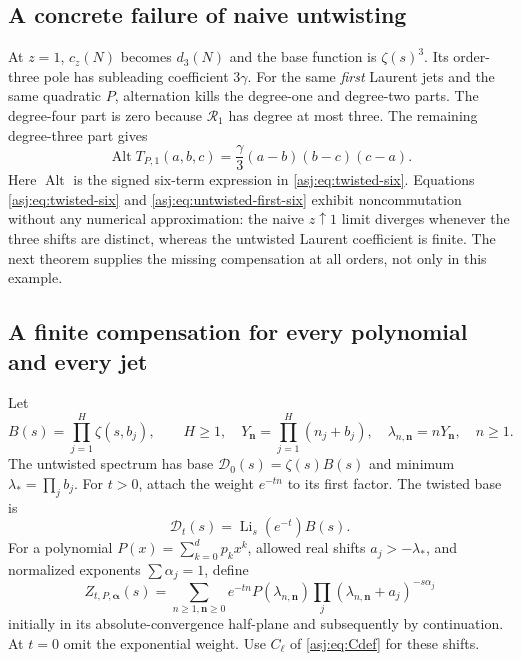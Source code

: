 \documentclass[11pt]{article}
\numberwithin{equation}{section}
\theoremstyle{definition}\newtheorem{definition}[theorem]{Definition}
\theoremstyle{remark}\newtheorem{remark}[theorem]{Remark}\newtheorem{example}[theorem]{Example}
\newcommand{\D}{\mathscr D}\newcommand{\calH}{\mathcal H}\newcommand{\calR}{\mathcal R}
\DeclareMathOperator{\Li}{Li}\DeclareMathOperator{\FP}{FP}\DeclareMathOperator{\Res}{Res}
\begin{document}
\subsection{A concrete failure of naive untwisting}
At $z=1$, $c_z(N)$ becomes $d_3(N)$ and the base function is $\zeta(s)^3$.
Its order-three pole has subleading coefficient $3\gamma$. For the same
\emph{first} Laurent jets and the same quadratic $P$, alternation kills
the degree-one and degree-two parts. The degree-four part is zero because
$\calR_1$ has degree at most three. The remaining degree-three part gives
\begin{equation}\label{asj:eq:untwisted-first-six}
 \operatorname{Alt}T_{P,1}(a,b,c)
           =\frac\gamma3(a-b)(b-c)(c-a).
\end{equation}
Here $\operatorname{Alt}$ is the signed six-term expression in
\eqref{asj:eq:twisted-six}. Equations \eqref{asj:eq:twisted-six} and
\eqref{asj:eq:untwisted-first-six} exhibit noncommutation without any
numerical approximation: the naive $z\uparrow1$ limit diverges whenever
the three shifts are distinct, whereas the untwisted Laurent coefficient
is finite. The next theorem supplies the missing compensation at all
orders, not only in this example.

\subsection{A finite compensation for every polynomial and every jet}
Let
\[
 B(s)=\prod_{j=1}^H\zeta(s,b_j),\qquad H\ge1,
 \quad Y_{\boldsymbol n}=\prod_{j=1}^H(n_j+b_j),
 \quad \lambda_{n,\boldsymbol n}=nY_{\boldsymbol n},\quad n\ge1.
\]
The untwisted spectrum has base $\D_0(s)=\zeta(s)B(s)$ and minimum
$\lambda_* =\prod_jb_j$. For $t>0$, attach the weight $e^{-tn}$ to its
first factor. The twisted base is
\[
 \D_t(s)=\Li_s(e^{-t})B(s).
\]
For a polynomial $P(x)=\sum_{k=0}^d p_kx^k$, allowed real shifts
$a_j>-\lambda_*$, and normalized exponents $\sum\alpha_j=1$, define
\begin{equation}\label{asj:eq:Zt}
 Z_{t,P,\boldsymbol\alpha}(s)
   =\sum_{n\ge1,\boldsymbol n\ge0}
       e^{-tn}P(\lambda_{n,\boldsymbol n})
         \prod_j(\lambda_{n,\boldsymbol n}+a_j)^{-s\alpha_j}
\end{equation}
initially in its absolute-convergence half-plane and subsequently by
continuation. At $t=0$ omit the exponential weight. Use $C_\ell$ of
\eqref{asj:eq:Cdef} for these shifts.
\end{document}
